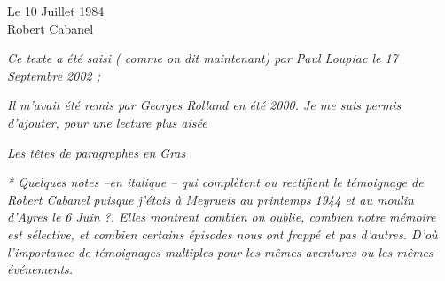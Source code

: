\vspace{0.8cm}

\begin{flushright}
Le 10 Juillet 1984\\
Robert Cabanel
\end{flushright}

\vfill

\textit{Ce texte a été saisi ( comme on dit maintenant) par Paul Loupiac le 17 Septembre 2002 ;}

\vspace{0.3cm}

\textit{Il m’avait été remis par Georges Rolland en été 2000. Je me suis permis d’ajouter, pour une lecture
plus aisée}

\vspace{0.3cm}

\textit{Les têtes de paragraphes en Gras}

\vspace{0.3cm}

\textit{* Quelques notes --en italique -- qui complètent ou rectifient le témoignage de Robert Cabanel puisque
j’étais à Meyrueis au printemps 1944 et au moulin d’Ayres le 6 Juin ?. Elles montrent combien on
oublie, combien notre mémoire est sélective, et combien certains épisodes nous ont frappé et pas
d’autres. D’où l’importance de témoignages multiples pour les mêmes aventures ou les mêmes
événements.}
